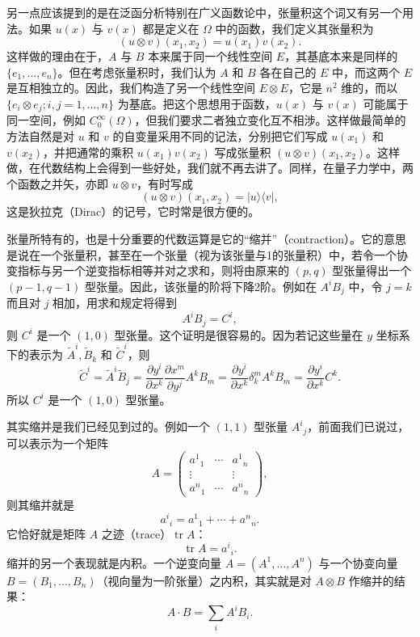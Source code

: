 另一点应该提到的是在泛函分析特别在广义函数论中，张量积这个词又有另一个用法。如果 $u(x)$ 与 $v(x)$ 都是定义在 $\Omega$ 中的函数，我们定义其张量积为
\[
 (u\otimes v)(x_1,x_2)=u(x_1)v(x_2).
\]
这样做的理由在于，$A$ 与 $B$ 本来属于同一个线性空间 $E$，其基底本来是同样的 $\{e_1,\ldots,e_n\}$。但在考虑张量积时，我们认为 $A$ 和 $B$ 各在自己的 $E$ 中，而这两个 $E$ 是互相独立的。因此，我们构造了另一个线性空间 $E\otimes E$，它是 $n^2$ 维的，而以 $\{e_i\otimes e_j;i,j=1,\ldots,n\}$ 为基底。把这个思想用于函数，$u(x)$ 与 $v(x)$ 可能属于同一空间，例如 $C_0^\infty(\Omega)$，但我们要求二者独立变化互不相涉。这样做最简单的方法自然是对 $u$ 和 $v$ 的自变量采用不同的记法，分别把它们写成 $u(x_1)$ 和 $v(x_2)$，并把通常的乘积 $u(x_1)v(x_2)$ 写成张量积 $(u\otimes v)(x_1,x_2)$。这样做，在代数结构上会得到一些好处，我们就不再去讲了。同样，在量子力学中，两个函数之并矢，亦即 $u\otimes v$，有时写成
\[
 (u\otimes v)(x_1,x_2)=|u\rangle\langle v|,
\]
这是狄拉克（Dirac）的记号，它时常是很方便的。

张量所特有的，也是十分重要的代数运算是它的“缩并”（contraction）。它的意思是说在一个张量积，甚至在一个张量（视为该张量与1的张量积）中，若令一个协变指标与另一个逆变指标相等并对之求和，则将由原来的 $(p,q)$ 型张量得出一个 $(p-1,q-1)$ 型张量。因此，该张量的阶将下降2阶。例如在 $A^iB_j$ 中，令 $j=k$ 而且对 $j$ 相加，用求和规定将得到
\[
 A^iB_j=C^i,
\]
则 $C^i$ 是一个 $(1,0)$ 型张量。这个证明是很容易的。因为若记这些量在 $y$ 坐标系下的表示为 $\widetilde A^i,\widetilde B_k$ 和 $\widetilde C^i$，则
\[
 \widetilde C^i=\widetilde A^i\widetilde B_j
 =\frac{\partial y^i}{\partial x^k}\frac{\partial x^m}{\partial y^j}A^kB_m
 =\frac{\partial y^i}{\partial x^k}\delta^m_k A^kB_m
 =\frac{\partial y^i}{\partial x^k}C^k.
\]
所以 $C^i$ 是一个 $(1,0)$ 型张量。

其实缩并是我们已经见到过的。例如一个 $(1,1)$ 型张量 $A^i{}_j$，前面我们已说过，可以表示为一个矩阵
\[
 A=\begin{pmatrix}
 a^1{}_1&\cdots&a^1{}_n\\
 \vdots&&\vdots\\
 a^n{}_1&\cdots&a^n{}_n
 \end{pmatrix},
\]
则其缩并就是
\[
 a^i{}_i=a^1{}_1+\cdots+a^n{}_n.
\]
它恰好就是矩阵 $A$ 之迹（trace）$\operatorname{tr}A$：
\[
 \operatorname{tr}A=a^i{}_i.
\]
缩并的另一个表现就是内积。一个逆变向量 $A=(A^1,\ldots,A^n)$ 与一个协变向量 $B=(B_1,\ldots,B_n)$（视向量为一阶张量）之内积，其实就是对 $A\otimes B$ 作缩并的结果：
\[
 A\cdot B=\sum_i A^iB_i.
\]

